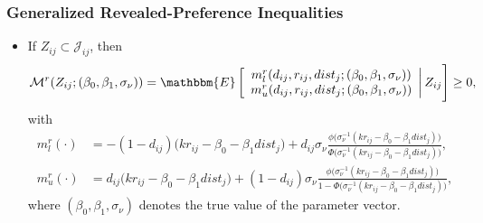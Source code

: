 \begin{frame}[label=revpref]
\frametitle{Generalized Revealed-Preference Inequalities}

\begin{itemize}
	\item If $Z_{ij}\subset\mathcal{J}_{ij}$, then
	\footnotesize
	\begin{align*}
	\mathcal{M}^{r}(Z_{ij};(\beta_{0},\beta_{1},\sigma_{\nu}))=\mathbbm{E}
	\left[
	\begin{array}{c}
	m^{r}_{l}(d_{ij},r_{ij},dist_{j};(\beta_{0},\beta_{1},\sigma_{\nu}))\\
	m^{r}_{u}(d_{ij},r_{ij},dist_{j};(\beta_{0},\beta_{1},\sigma_{\nu}))\\
	\end{array}\right|
	Z_{ij}
	\Bigg]\geq0,
	\end{align*}
	with
	\begin{align*}
	m^{r}_{l}(\cdot)&=-(1-d_{ij})\big(kr_{ij}-\beta_{0}-\beta_{1}dist_{j}\big)+d_{ij}\sigma_{\nu}\frac{\phi\big(\sigma_{\nu}^{-1}(kr_{ij}-\beta_{0}-\beta_{1}dist_{j})\big)}{\Phi\big(\sigma_{\nu}^{-1}(kr_{ij}-\beta_{0}-\beta_{1}dist_{j})\big)},\\
	m^{r}_{u}(\cdot)&=d_{ij}\big(kr_{ij}-\beta_{0}-\beta_{1}dist_{j}\big)+(1-d_{ij})\sigma_{\nu}\frac{\phi\big(\sigma_{\nu}^{-1}(kr_{ij}-\beta_{0}-\beta_{1}dist_{j})\big)}{1-\Phi\big(\sigma_{\nu}^{-1}(kr_{ij}-\beta_{0}-\beta_{1}dist_{j})\big)},
	\end{align*}
	\normalsize
	where $(\beta_{0},\beta_{1},\sigma_{\nu})$ denotes the true value of the parameter vector.
\end{itemize}
\end{frame}


